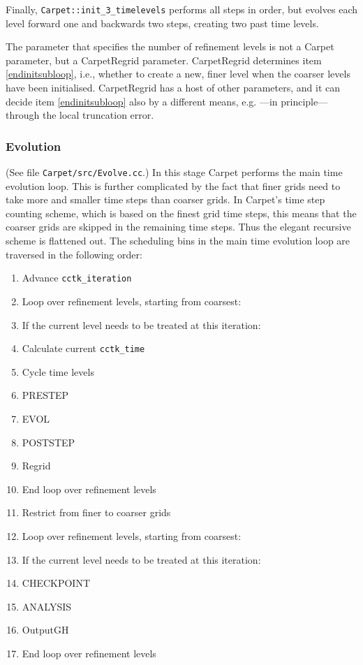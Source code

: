 \documentclass{article}
\begin{document}
Finally, \texttt{Carpet::init\_3\_timelevels} performs all steps in order, but
evolves each level forward one and backwards two steps, creating two
past time levels.

The parameter that specifies the number of refinement levels is not a
Carpet parameter, but a CarpetRegrid parameter.  CarpetRegrid
determines item \ref{endinitsubloop}, i.e., whether to create a new, finer
level when
the coarser levels have been initialised.  CarpetRegrid has a host of
other parameters, and it can decide item  \ref{endinitsubloop} also by a
different means,
e.g. ---in principle--- through the local truncation error.




\subsubsection{Evolution}

   (See file \texttt{Carpet/src/Evolve.cc}.)  In this stage Carpet
   performs the main time evolution loop.  This is further complicated
   by the fact that finer grids need to take more and smaller time
   steps than coarser grids.  In Carpet's time step counting scheme,
   which is based on the finest grid time steps, this means that the
   coarser grids are skipped in the remaining time steps.  Thus the
   elegant recursive scheme is flattened out.  The scheduling bins in
   the main time evolution loop are traversed in the following order:
\begin{enumerate}
\itemsep 0pt
\item
   Advance \texttt{cctk\_iteration}
\item
   Loop over refinement levels, starting from coarsest:
\item \quad
   If the current level needs to be treated at this iteration:
\item \quad \quad
   Calculate current \texttt{cctk\_time}
\item \quad \quad
   Cycle time levels
\item \quad \quad
   PRESTEP
\item \quad \quad
   EVOL
\item \quad \quad
   POSTSTEP
\item \quad \quad
   Regrid
\item
   End loop over refinement levels
\item
   Restrict from finer to coarser grids
\item
   Loop over refinement levels, starting from coarsest:
\item \quad
   If the current level needs to be treated at this iteration:
\item \quad \quad
   CHECKPOINT
\item \quad \quad
   ANALYSIS
\item \quad \quad
   OutputGH
\item
   End loop over refinement levels
\end{enumerate}
\end{document}
